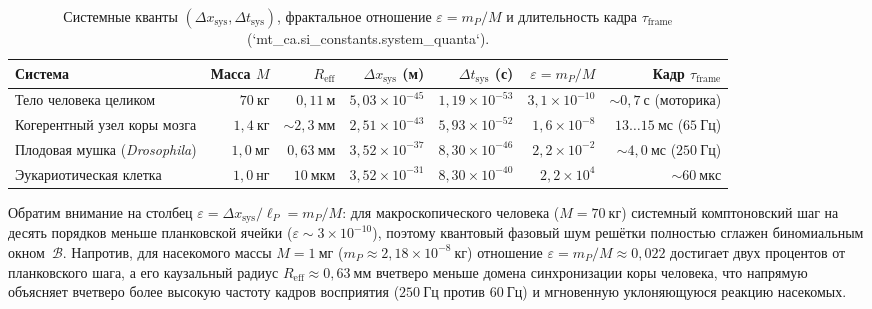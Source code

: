 \begin{table}[htbp]
\centering
\caption{Системные кванты $(\Delta x_{\mathrm{sys}}, \Delta t_{\mathrm{sys}})$, фрактальное отношение $\varepsilon = m_P/M$ и длительность кадра $\tau_{\mathrm{frame}}$ (`mt\_ca.si\_constants.system\_quanta`).}
\label{tab:observer-system-quanta}
\footnotesize
\setlength{\tabcolsep}{2.5pt}
\begin{tabular}{@{}lrrrrrr@{}}
\toprule
Система & Масса $M$ & $R_{\mathrm{eff}}$ & $\Delta x_{\mathrm{sys}}$ (м) & $\Delta t_{\mathrm{sys}}$ (с) & $\varepsilon = m_P/M$ & Кадр $\tau_{\mathrm{frame}}$ \\
\midrule
Тело человека целиком & $70\ \mathrm{кг}$ & $0{,}11\ \mathrm{м}$ & $5{,}03\times 10^{-45}$ & $1{,}19\times 10^{-53}$ & $3{,}1\times 10^{-10}$ & $\sim 0{,}7\ \mathrm{с}$ (моторика) \\
Когерентный узел коры мозга & $1{,}4\ \mathrm{кг}$ & $\sim 2{,}3\ \mathrm{мм}$ & $2{,}51\times 10^{-43}$ & $5{,}93\times 10^{-52}$ & $1{,}6\times 10^{-8}$ & $13\ldots 15\ \mathrm{мс}$ ($65\ \mathrm{Гц}$) \\
Плодовая мушка (\emph{Drosophila}) & $1{,}0\ \mathrm{мг}$ & $0{,}63\ \mathrm{мм}$ & $3{,}52\times 10^{-37}$ & $8{,}30\times 10^{-46}$ & $2{,}2\times 10^{-2}$ & $\sim 4{,}0\ \mathrm{мс}$ ($250\ \mathrm{Гц}$) \\
Эукариотическая клетка & $1{,}0\ \mathrm{нг}$ & $10\ \mathrm{мкм}$ & $3{,}52\times 10^{-31}$ & $8{,}30\times 10^{-40}$ & $2{,}2\times 10^{4}$ & $\sim 60\ \mathrm{мкс}$ \\
\bottomrule
\end{tabular}
\end{table}

Обратим внимание на столбец $\varepsilon = \Delta x_{\mathrm{sys}}/\ell_P = m_P/M$:
для макроскопического человека ($M = 70\ \mathrm{кг}$) системный комптоновский шаг на десять порядков меньше планковской ячейки ($\varepsilon \sim 3\times 10^{-10}$), поэтому квантовый фазовый шум решётки полностью сглажен биномиальным окном~$\mathcal{B}$.
Напротив, для насекомого массы $M = 1\ \mathrm{мг}$ ($m_P \approx 2{,}18\times 10^{-8}\ \mathrm{кг}$) отношение $\varepsilon = m_P/M \approx 0{,}022$ достигает двух процентов от планковского шага, а его каузальный радиус $R_{\mathrm{eff}} \approx 0{,}63\ \mathrm{мм}$ вчетверо меньше домена синхронизации коры человека, что напрямую объясняет вчетверо более высокую частоту кадров восприятия ($250\ \mathrm{Гц}$ против $60\ \mathrm{Гц}$) и мгновенную уклоняющуюся реакцию насекомых.

